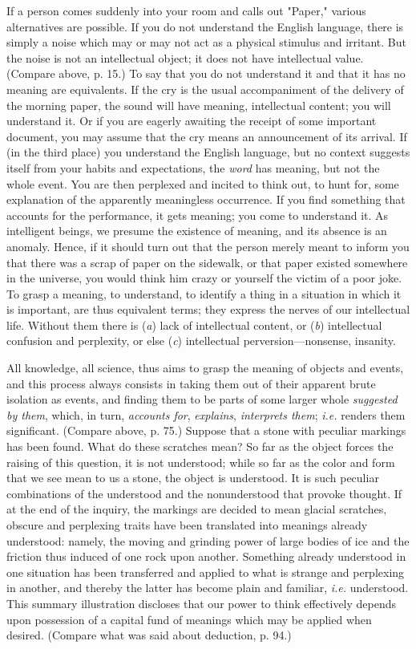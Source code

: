 \documentclass[letterpaper]{book}
\begin{document}
If a person comes suddenly into your room and calls out "Paper," various
alternatives are possible. If you do not understand the English
language, there is simply a noise which may or may not act as a physical
stimulus
and irritant. But the noise is not an intellectual object; it does not
have intellectual value. (Compare above, p. 15.) To say that you do not
understand it and that it has no meaning are equivalents. If the cry is
the usual accompaniment of the delivery of the morning paper, the sound
will have meaning, intellectual content; you will understand it. Or if
you are eagerly awaiting the receipt of some important document, you may
assume that the cry means an announcement of its arrival. If (in the
third place) you understand the English language, but no context
suggests itself from your habits and expectations, the \emph{word} has
meaning, but not the whole event. You are then perplexed and incited to
think out, to hunt for, some explanation of the apparently meaningless
occurrence. If you find something that accounts for the performance, it
gets meaning; you come to understand it. As intelligent beings, we
presume the existence of meaning, and its absence is an anomaly. Hence,
if it should turn out that the person merely meant to inform you that
there was a scrap of paper on the sidewalk, or that paper existed
somewhere in the universe, you would think him crazy or yourself the
victim of a poor joke. To grasp a meaning, to understand, to identify a
thing in a situation in which it is important, are thus equivalent
terms; they express the nerves of our intellectual life. Without them
there is (\emph{a}) lack of intellectual content, or (\emph{b})
intellectual confusion and perplexity, or else (\emph{c}) intellectual
perversion---nonsense, insanity.


All knowledge, all science, thus aims to grasp the meaning of objects
and events, and this process always consists in taking them out of their
apparent brute isolation as events, and finding them to be parts of
some
larger whole \emph{suggested by them}, which, in turn, \emph{accounts
for}, \emph{explains}, \emph{interprets them}; \emph{i.e.} renders them
significant. (Compare above, p. 75.) Suppose that a stone with peculiar
markings has been found. What do these scratches mean? So far as the
object forces the raising of this question, it is not understood; while
so far as the color and form that we see mean to us a stone, the object
is understood. It is such peculiar combinations of the understood and
the nonunderstood that provoke thought. If at the end of the inquiry,
the markings are decided to mean glacial scratches, obscure and
perplexing traits have been translated into meanings already understood:
namely, the moving and grinding power of large bodies of ice and the
friction thus induced of one rock upon another. Something already
understood in one situation has been transferred and applied to what is
strange and perplexing in another, and thereby the latter has become
plain and familiar, \emph{i.e.} understood. This summary illustration
discloses that our power to think effectively depends upon possession of
a capital fund of meanings which may be applied when desired. (Compare
what was said about deduction, p. 94.)
\end{document}
